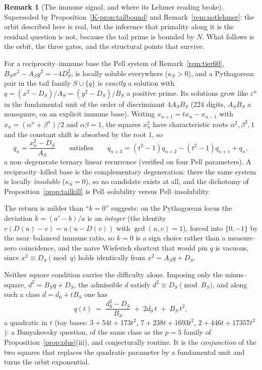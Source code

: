 \documentclass[11pt]{article}
\theoremstyle{definition}
\newtheorem{remark}[theorem]{Remark}
\begin{document}
\begin{remark}[The immune signal, and where its Lehmer reading broke]\label{rem:lehmer}
Superseded by Proposition~\ref{K-prop:tailbound} and Remark~\ref{rem:notlehmer}: the orbit described
here is real, but the inference that primality along it is the residual question is not, because the
tail prime is bounded by $N$. What follows is the orbit, the three gates, and the structural points
that survive.

For a reciprocity--immune base the Pell system of Remark~\ref{rem:tier60},
$B_Sx^2-A_Sy^2=-4D_S^2$, is locally soluble everywhere ($\kappa_S>0$), and a Pythagorean pair in the
tail family $S\cup\{q\}$ is \emph{exactly} a solution with $q=(x^2-D_S)/A_S=(y^2-D_S)/B_S$ a
positive prime. Its solutions grow like $\varepsilon^n$ in the fundamental unit of the order of
discriminant $4A_SB_S$ ($224$ digits, $A_SB_S$ a nonsquare, on an explicit immune base). Writing
$x_{n+1}=tx_n-x_{n-1}$ with $x_n=(\alpha^n+\beta^n)/2$ and $\alpha\beta=1$, the squares $x_n^2$ have
characteristic roots $\alpha^2,\beta^2,1$ and the constant shift is absorbed by the root $1$, so
\[ q_n=\frac{x_n^2-D_S}{A_S}\qquad\text{satisfies}\qquad q_{n+3}=(t^2-1)q_{n+2}-(t^2-1)q_{n+1}+q_n, \]
a non--degenerate ternary linear recurrence (verified on four Pell parameters). A
reciprocity--killed base is the complementary degeneration: there the same system is locally
\emph{insoluble} ($\kappa_S=0$), so no candidate exists at all, and the dichotomy of
Proposition~\ref{prop:tailkill} is Pell--solubility versus Pell--insolubility.

The return is milder than ``$k=0$'' suggests: on the Pythagorean locus the deviation $k=(a'-b)/a$ is
an \emph{integer} (the identity $v(D(u)-v)=u(u-D(v))$ with $\gcd(u,v)=1$), forced into $\{0,-1\}$ by
the near--balanced immune ratio, so $k=0$ is a sign choice rather than a measure--zero coincidence,
and the naive Wieferich shortcut that would pin $q$ is vacuous, since $x^2\equiv D_S\pmod q$ holds
identically from $x^2=A_Sq+D_S$.

Neither square condition carries the difficulty alone. Imposing only the minus--square,
$d^2=B_Sq+D_S$, the admissible $d$ satisfy $d^2\equiv D_S\pmod{B_S}$, and along such a class
$d=d_0+tB_S$ one has
\[ q(t)\;=\;\frac{d_0^2-D_S}{B_S}\;+\;2d_0\,t\;+\;B_S\,t^2, \]
a quadratic in $t$ (toy bases: $3+54t+173t^2$, $7+238t+1693t^2$, $2+446t+17357t^2$): a Bunyakovsky
question, of the same class as the $p=5$ family of Proposition~\ref{prop:plus}\textup{(iii)}, and
conjecturally routine. It is the \emph{conjunction} of the two squares that replaces the quadratic
parameter by a fundamental unit and turns the orbit exponential.


\end{remark}
\end{document}
